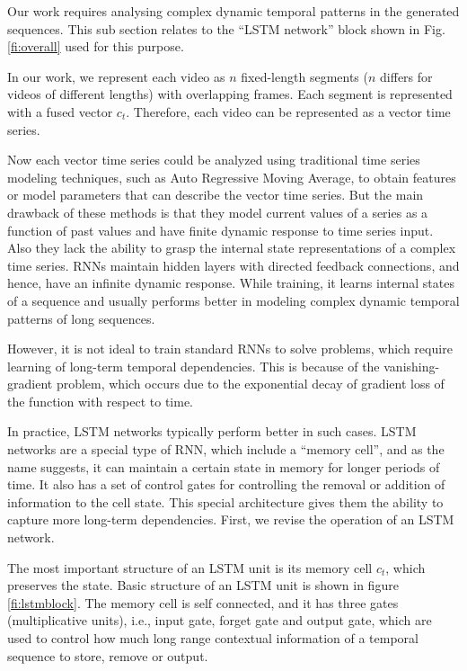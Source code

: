 Our work requires analysing complex dynamic temporal patterns in the generated sequences. This sub section relates to the ``LSTM network'' block shown in Fig. \ref{fi:overall} used for this purpose.

In our work, we represent each video as $n$ fixed-length segments ($n$ differs for videos of different lengths) with overlapping frames.  Each segment is represented with a fused vector $c_{t}$. Therefore, each video can be represented as a vector time series. 

Now each vector time series could be analyzed using traditional time series modeling techniques, such as Auto Regressive Moving Average, to obtain features or model parameters that can describe the vector time series. But the main drawback of these methods is that they model current values of a series as a function of past values and have finite dynamic response to time series input. Also they lack the ability to grasp the internal state representations of a complex time series. RNNs maintain hidden layers with directed feedback connections, and hence, have an infinite dynamic response. While training, it learns internal states of a sequence and usually performs better in modeling complex dynamic temporal patterns of long sequences.

However, it is not ideal to train standard RNNs to solve problems, which require learning of long-term temporal dependencies. This is because of the vanishing-gradient problem, which occurs
due to the exponential decay of gradient loss of the function with respect to time.

In practice, LSTM networks typically perform better in such cases.
LSTM networks are a special type of RNN, which include a ``memory cell'', and as the name suggests,
it can maintain a certain state in memory for longer periods of time.
It also has a set of control gates for controlling the removal or addition of information to the cell state.
This special architecture gives them the ability to capture more long-term dependencies. First, we revise the operation of an LSTM network.

The most important structure of an LSTM unit is its memory cell $c_{t}$, which preserves the state. Basic structure of an LSTM unit is shown in figure \ref{fi:lstmblock}. The memory cell is self connected, and it has three gates (multiplicative units), i.e., input gate, forget gate and
output gate, which are used to control how much long range contextual information of a temporal sequence to store, remove or output.


